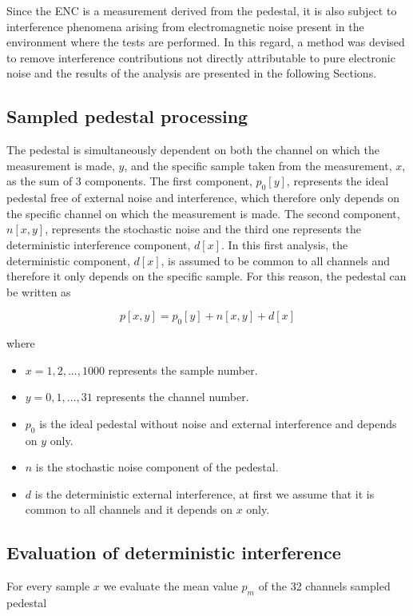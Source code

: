\par
Since the ENC is a measurement derived from the pedestal, it is also subject to interference phenomena arising from electromagnetic noise present in the environment where the tests are performed. In this regard, a method was devised to remove interference contributions not directly attributable to pure electronic noise and the results of the analysis are presented in the following Sections.

\subsection{Sampled pedestal processing}
The pedestal is simultaneously dependent on both the channel on which the measurement is made, $y$, and the specific sample taken from the measurement, $x$, as the sum of 3 components. The first component, $p_0[y]$, represents the ideal pedestal free of external noise and interference, which therefore only depends on the specific channel on which the measurement is made. The second component, $n[x, y]$, represents the stochastic noise and the third one represents the deterministic interference component, $d[x]$. In this first analysis, the deterministic component, $d[x]$, is assumed to be common to all channels and therefore it only depends on the specific sample. For this reason, the pedestal can be written as

\begin{equation} \label{eq1}
    p[x,y] = p_0[y] + n[x, y] + d[x]
\end{equation}

\noindent
where
\begin{itemize}
    \itemsep0em 
    \item $x=1,2,...,1000$ represents the sample number.
    \item $y=0,1,...,31$ represents the channel number.
    \item $p_0$ is the ideal pedestal without noise and external interference and depends on $y$ only.
    \item $n$ is the stochastic noise component of the pedestal.
    \item $d$ is the deterministic external interference, at first we assume that it is common to all channels and it depends on $x$ only.
\end{itemize}

\subsection{Evaluation of deterministic interference}
For every sample $x$ we evaluate the mean value $p_{m}$ of the 32 channels sampled pedestal


